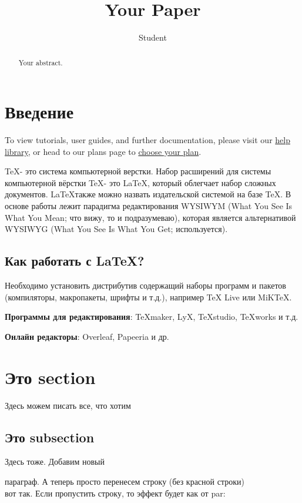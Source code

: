 \documentclass{article}
\begin{document}
\title{Your Paper}
\author{Student}


\maketitle

\begin{abstract}
Your abstract.
\end{abstract}

\tableofcontents{}

\section{Введение}
To view tutorials, user guides, and further documentation, please visit our \href{https://www.overleaf.com/learn}{help library}, or head to our plans page to \href{https://www.overleaf.com/user/subscription/plans}{choose your plan}.

\TeX - это система компьютерной верстки. Набор расширений для системы компьютерной вёрстки \TeX - это \LaTeX, который облегчает набор сложных документов. \LaTeX также можно назвать издательской системой на базе \TeX. В основе работы лежит парадигма редактирования WYSIWYM (What You See Is What You Mean; что вижу, то и подразумеваю), которая является альтернативой WYSIWYG (What You See Is What You Get; используется).

\subsection*{Как работать с \LaTeX?}
Необходимо установить дистрибутив содержащий наборы программ и пакетов (компиляторы, макропакеты, шрифты и т.д.), например TeX Live или MiKTeX. 

\textbf{Программы для редактирования}: TeXmaker, LyX, TeXstudio, TeXworks и т.д.

\textbf{Онлайн редакторы}: Overleaf, Papeeria и др.

\section{Это section}
Здесь можем писать все, что хотим

\subsection{Это subsection}
 Здесь тоже. Добавим новый
 \par
 параграф. А теперь просто перенесем строку (без красной строки)
 \\
 вот так. Если пропустить строку, то эффект будет как от par:
 
\end{document}

